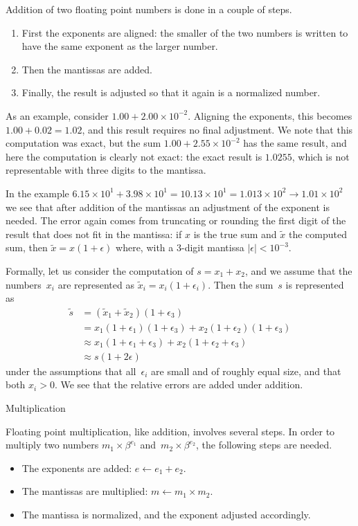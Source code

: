 Addition of two floating point numbers is done in a couple of steps.
\begin{enumerate}
\item
  First the exponents are aligned: the smaller of the two numbers is
  written to have the same exponent as the larger number.
\item Then the
  mantissas are added.
\item Finally, the result is adjusted
  so that it again is a normalized number.
\end{enumerate}
As an example, consider $1.00+2.00\times 10^{-2}$. Aligning the
exponents, this becomes $1.00+0.02=1.02$, and this result requires no
final adjustment. We note that this computation was exact, but
the sum $1.00+2.55\times 10^{-2}$ has the same result, and here the
computation is clearly not exact: the exact result is $1.0255$, which
is not representable with three digits to the mantissa.

In the example $6.15\times 10^1+3.98\times 10^1=10.13\times 10^1=1.013\times
10^2\rightarrow 1.01\times 10^2$ we see that after addition of the mantissas an
adjustment of the exponent is needed. The error again comes from
truncating or rounding the first digit of the result that does not fit
in the mantissa: if $x$ is the true sum and $\tilde x$ the computed
sum, then $\tilde x=x(1+\epsilon)$ where, with a 3-digit mantissa
$|\epsilon|<10^{-3}$.

Formally, let us consider the computation of
$s=x_1+x_2$, and we assume that the numbers~$x_i$ are represented
as $\tilde x_i=x_i(1+\epsilon_i)$.
Then the sum~$s$ is represented as
\begin{equation}
\begin{array}{rl}
\tilde s&=(\tilde x_1+\tilde x_2)(1+\epsilon_3)\\
&=x_1(1+\epsilon_1)(1+\epsilon_3)+x_2(1+\epsilon_2)(1+\epsilon_3)\\
&\approx x_1(1+\epsilon_1+\epsilon_3)+x_2(1+\epsilon_2+\epsilon_3)\\
&\approx s(1+2\epsilon)
\end{array}
\end{equation}
under the assumptions that all~$\epsilon_i$ are small and of roughly
equal size, and that both $x_i>0$.
We see that the relative errors are added under addition.

 {Multiplication}

Floating point multiplication, like addition, involves several steps.
In order to multiply two numbers $m_1\times\beta^{e_1}$
and~$m_2\times\beta^{e_2}$, the following steps are needed.
\begin{itemize}
\item The exponents are added: $e\leftarrow e_1+e_2$.
\item The mantissas are multiplied: $m\leftarrow
  m_1\times m_2$.
\item The mantissa is normalized, and the exponent adjusted accordingly.
\end{itemize}

